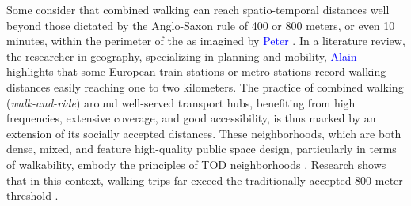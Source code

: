 \begin{refsegment}
Some consider that combined walking can reach spatio-temporal distances well beyond those dictated by the Anglo-Saxon rule of 400 or 800 meters, or even 10 minutes, within the perimeter of the  as imagined by \textcolor{blue}{Peter} \textcolor{blue}{\textcite[56]{calthorpe_next_1993}}. In a literature review, the researcher in geography, specializing in planning and mobility, \textcolor{blue}{Alain} \textcolor{blue}{\textcite[5]{lhostis_perimetres_2016}} highlights that some European train stations or metro stations record walking distances easily reaching one to two kilometers. The practice of combined walking (\textsl{walk-and-ride}) around well-served transport hubs, benefiting from high frequencies, extensive coverage, and good accessibility, is thus marked by an extension of its socially accepted distances. These neighborhoods, which are both dense, mixed, and feature high-quality public space design, particularly in terms of \gls{walkability}, embody the principles of \acrshort{TOD} neighborhoods \textcolor{blue}{\autocites[79]{ker_myths_2003}[7]{lhostis_perimetres_2016}[30]{hasiak_access_2019}}. Research shows that in this context, walking trips far exceed the traditionally accepted 800-meter threshold \textcolor{blue}{\autocites[79]{ker_myths_2003}[7]{lhostis_perimetres_2016}[30]{hasiak_access_2019}}.%


\end{refsegment}
